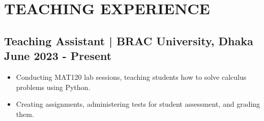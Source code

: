 \documentclass[letterpaper,11pt]{article}
\begin{document}
\section{\textbf{TEACHING EXPERIENCE}}
\subsection*{Teaching Assistant | BRAC University, Dhaka \hfill June 2023 - Present}
\vspace{-0.5em} %
\begin{itemize}[left=0cm]
    \setlength\itemsep{-0.075em} %
    \setlength\parskip{-0.075em} %
    \setlength{\itemsep}{0pt}
    \setlength{\parskip}{0pt}
    \setlength{\leftmargin}{0pt}
    \item Conducting MAT120 lab sessions, teaching students how to solve calculus problems using Python.
    \item Creating assignments, administering tests for student assessment, and grading them.
\end{itemize}



    
\end{document}
